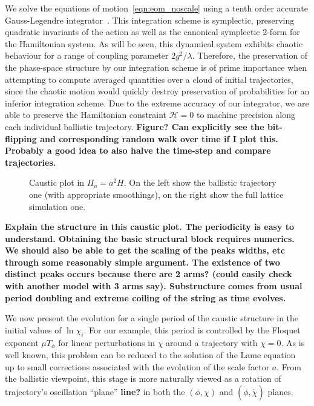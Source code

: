 We solve the equations of motion~\eqref{eqn:eom_noscale} using a tenth order accurate Gauss-Legendre integrator~\cite{Butcher,Braden}.
This integration scheme is symplectic, preserving quadratic invariants of the action as well as the canonical symplectic 2-form for the Hamiltonian system.
As will be seen, this dynamical system exhibits chaotic behaviour for a range of coupling parameter $2g^2/\lambda$.
Therefore, the preservation of the phase-space structure by our integration scheme is of prime importance when attempting to compute averaged quantities over a cloud of initial trajectories,
since the chaotic motion would quickly destroy preservation of probabilities for an inferior integration scheme.
Due to the extreme accuracy of our integrator, we are able to preserve the Hamiltonian constraint $\mathcal{H}=0$ to machine precision along each individual ballistic trajectory.
{\bf Figure?  Can explicitly see the bit-flipping and corresponding random walk over time if I plot this.  Probably a good idea to also halve the time-step and compare trajectories.}


\begin{figure}
  \caption{Caustic plot in $\Pi_a = a^2H$.  On the left show the ballistic trajectory one (with appropriate smoothings), on the right show the full lattice simulation one.}
\end{figure}
{\bf Explain the structure in this caustic plot.  The periodicity is easy to understand.  Obtaining the basic structural block requires numerics.  We should also be able to get the scaling of the peaks widths, etc through some reasonably simple argument.  The existence of two distinct peaks occurs because there are 2 arms? (could easily check with another model with 3 arms say).  Substructure comes from usual period doubling and extreme coiling of the string as time evolves.}

We now present the evolution for a single period of the caustic structure in the initial values of $\ln\chi_i$.
For our example, this period is controlled by the Floquet exponent $\mu T_\phi$ for linear perturbations in $\chi$ around a trajectory with $\chi=0$.
As is well known, this problem can be reduced to the solution of the Lame equation~\cite{KofmanGreene} up to small corrections associated with the evolution of the scale factor $a$.
From the ballistic viewpoint, this stage is more naturally viewed as a rotation of trajectory's oscillation ``plane'' {\bf line?} in both the $(\phi,\chi)$ and $(\dot{\phi},\dot{\chi})$ planes.

